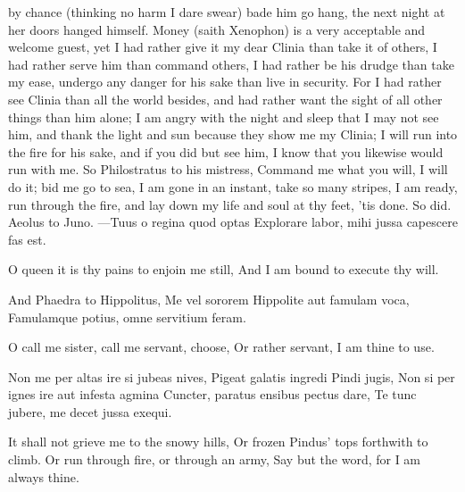 by chance (thinking no harm I dare swear) bade him go hang, the next
night at her doors hanged himself. Money (saith Xenophon) is a
very acceptable and welcome guest, yet I had rather give it my dear
Clinia than take it of others, I had rather serve him than command
others, I had rather be his drudge than take my ease, undergo any
danger for his sake than live in security. For I had rather see Clinia
than all the world besides, and had rather want the sight of all other
things than him alone; I am angry with the night and sleep that I may
not see him, and thank the light and sun because they show me my
Clinia; I will run into the fire for his sake, and if you did but see
him, I know that you likewise would run with me. So Philostratus to his
mistress, Command me what you will, I will do it; bid me go to
sea, I am gone in an instant, take so many stripes, I am ready, run
through the fire, and lay down my life and soul at thy feet, 'tis done.
So did. Aeolus to Juno.
---Tuus o regina quod optas
Explorare labor, mihi jussa capescere fas est.

O queen it is thy pains to enjoin me still,
And I am bound to execute thy will.

And Phaedra to Hippolitus,
Me vel sororem Hippolite aut famulam voca,
Famulamque potius, omne servitium feram.

O call me sister, call me servant, choose,
Or rather servant, I am thine to use.

Non me per altas ire si jubeas nives,
Pigeat galatis ingredi Pindi jugis,
Non si per ignes ire aut infesta agmina
Cuncter, paratus ensibus pectus dare,
Te tunc jubere, me decet jussa exequi.

It shall not grieve me to the snowy hills,
Or frozen Pindus' tops forthwith to climb.
Or run through fire, or through an army,
Say but the word, for I am always thine.

